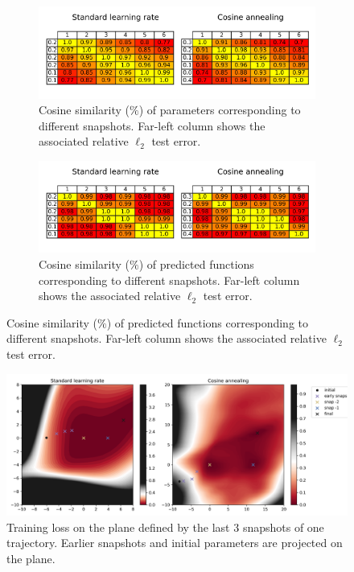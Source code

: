 \begin{figure}[H]
	\centering
	\begin{subfigure}{1\textwidth}
		\centering
		\includegraphics[width=1\linewidth]{./figs/params_cosine_similarities.png}  
		\caption{Cosine similarity ($\%$) of parameters corresponding to different snapshots. Far-left column shows the associated relative $\ell_2$ test error.}
		\label{fig:sub-first}
	\end{subfigure}
	\begin{subfigure}{1\textwidth}
		\centering
		\includegraphics[width=1\linewidth]{./figs/preds_cosine_similarities.png}  
		\caption{Cosine similarity ($\%$) of predicted functions corresponding to different snapshots. Far-left column shows the associated relative $\ell_2$ test error.}
		\label{fig:sub-second}
	\end{subfigure}	
\end{figure}

\begin{figure}[H]
	\centering
	\includegraphics[width=1\linewidth]{./figs/planes.png}  
	\caption{Training loss on the plane defined by the last 3 snapshots of one trajectory. Earlier snapshots and initial parameters are projected on the plane.}
	\label{}
\end{figure}

